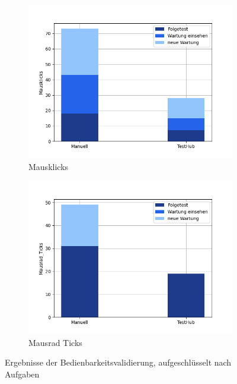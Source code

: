 \begin{figure}[H]
\begin{subfigure}{.5\textwidth}
        \includegraphics[width=\linewidth]{resources/validierung_Mausklicks.png}
        \caption{Mausklicks}
      \end{subfigure}%
      \begin{subfigure}{.5\textwidth}
        \centering
        \includegraphics[width=\linewidth]{resources/validierung_Mausrad_Ticks.png}
        \caption{Mausrad Ticks}
      \end{subfigure}
    \caption{Ergebnisse der Bedienbarkeitsvalidierung, aufgeschlüsselt nach Aufgaben}
   
\end{figure}

